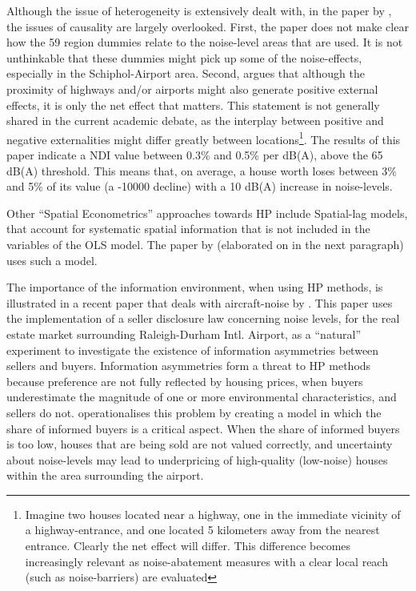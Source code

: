 \documentclass[a4paper]{scrartcl}
\begin{document}
Although the issue of heterogeneity is extensively dealt with, in the paper by \cite{Theebe2004}, the issues of causality are largely overlooked. First, the paper does not make clear how the 59 region dummies relate to the noise-level areas that are used. It is not unthinkable that these dummies might pick up some of the noise-effects, especially in the Schiphol-Airport area. Second, \cite{Theebe2004} argues that although the proximity of highways and/or airports might also generate positive external effects, it is only the net effect that matters. This statement is not generally shared in the current academic debate, as the interplay between positive and negative externalities might differ greatly between locations\footnote{Imagine two houses located near a highway, one in the immediate vicinity of a highway-entrance, and one located 5 kilometers away from the nearest entrance. Clearly the net effect will differ. This difference becomes increasingly relevant as noise-abatement measures with a clear local reach (such as noise-barriers) are evaluated}. The results of this paper indicate a NDI value between 0.3\% and 0.5\% per dB(A), above the 65 dB(A) threshold. This means that, on average, a house worth  loses between 3\% and 5\% of its value (a -10000 decline) with a 10 dB(A) increase in noise-levels.

Other “Spatial Econometrics” approaches towards HP include Spatial-lag models, that account for systematic spatial information that is not included in the variables of the OLS model. The paper by \cite{Pope2008} (elaborated on in the next paragraph) uses such a model. 

The importance of the information environment, when using HP methods, is illustrated in a recent paper that deals with aircraft-noise by \cite{Pope2008}. This paper uses the implementation of a seller disclosure law concerning noise levels, for the real estate market surrounding Raleigh-Durham Intl. Airport, as a “natural” experiment to investigate the existence of information asymmetries between sellers and buyers.  Information asymmetries form a threat to HP methods because preference are not fully reflected by housing prices, when buyers underestimate the magnitude of one or more environmental characteristics, and sellers do not. \cite{Pope2008} operationalises this problem by creating a model in which the share of informed buyers is a critical aspect. When the share of informed buyers is too low, houses that are being sold are not valued correctly, and uncertainty about noise-levels may lead to underpricing of high-quality (low-noise) houses within the area surrounding the airport. 
\end{document}
